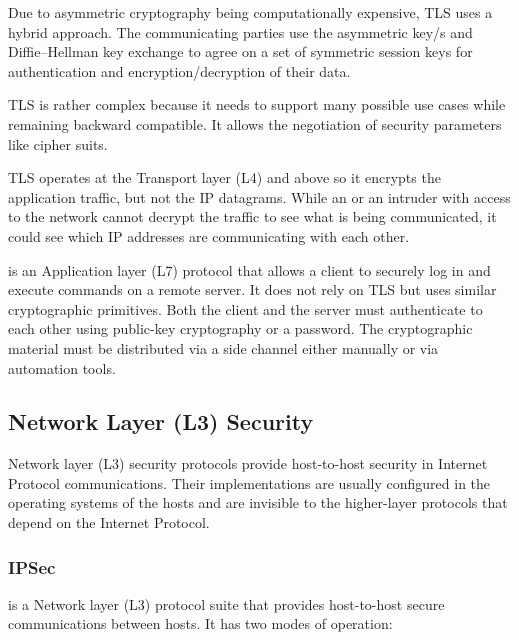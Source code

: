Due to asymmetric cryptography being computationally expensive, TLS uses
a hybrid approach. The communicating parties use the asymmetric key/s
and Diffie--Hellman key exchange to agree on a set of symmetric session
keys for authentication and encryption/decryption of their data.

TLS is rather complex because it needs to support many possible use
cases while remaining backward compatible. It allows the negotiation of
security parameters like cipher suits.

TLS operates at the Transport layer (L4) and above so it encrypts the
application traffic, but not the IP datagrams. While an  or an
intruder with access to the network cannot decrypt the traffic to see
what is being communicated, it could see which IP addresses are
communicating with each other.

 is an Application layer (L7) protocol that allows a client to
securely log in and execute commands on a remote server. It does not
rely on TLS but uses similar cryptographic primitives. Both the client
and the server must authenticate to each other using public-key
cryptography or a password. The cryptographic material must be
distributed via a side channel either manually or via automation tools.

\hypertarget{network-layer-l3-security}{%
\subsection{Network Layer (L3)
Security}\label{network-layer-l3-security}}

Network layer (L3) security protocols provide host-to-host security in
Internet Protocol communications. Their implementations are usually
configured in the operating systems of the hosts and are invisible to
the higher-layer protocols that depend on the Internet Protocol.

\hypertarget{ipsec}{%
\subsubsection{IPSec}\label{ipsec}}

 is a Network layer (L3) protocol suite that provides
host-to-host secure communications between  hosts. It has two
modes of operation:


